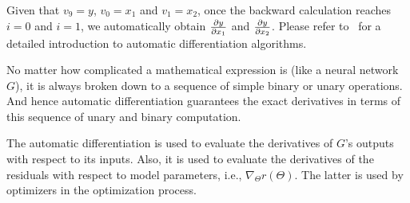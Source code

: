 Given that $v_9=y$, $v_0=x_1$ and $v_1=x_2$, once the backward calculation reaches $i=0$ and $i=1$, we automatically obtain $\frac{\partial y}{\partial x_1}$ and $\frac{\partial y}{\partial x_2}$.
Please refer to~\cite{griewank_automatic_1988} for a detailed introduction to automatic differentiation algorithms.

No matter how complicated a mathematical expression is (like a neural network $G$), it is always broken down to a sequence of simple binary or unary operations.
And hence automatic differentiation guarantees the exact derivatives in terms of this sequence of unary and binary computation.

The automatic differentiation is used to evaluate the derivatives of $G$'s outputs with respect to its inputs.
Also, it is used to evaluate the derivatives of the residuals with respect to model parameters, i.e., $\nabla_{\Theta} r(\Theta)$.
The latter is used by optimizers in the optimization process.
